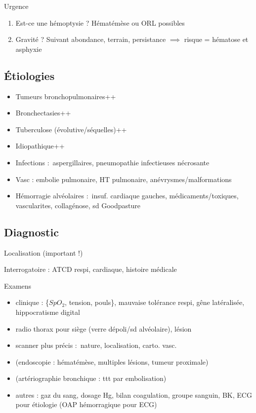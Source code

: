 \documentclass{article}
\begin{document}
Urgence \skull

\begin{enumerate}
  \item Est-ce une hémoptysie ? Hématémèse ou ORL possibles
  \item Gravité ? Suivant abondance, terrain, persistance $\implies$ risque = hématose et asphyxie
\end{enumerate}

\subsection{Étiologies}
\begin{itemize}
  \item Tumeurs bronchopulmonaires++
  \item Bronchectasies++
  \item Tuberculose (évolutive/séquelles)++
  \item Idiopathique++
  \item Infections : aspergillaires, pneumopathie infectieuses nécrosante
  \item Vasc : embolie pulmonaire, HT pulmonaire, anévrysmes/malformations
  \item Hémorragie alvéolaires : insuf. cardiaque gauches, médicaments/toxiques,
    vascularites, collagénose, sd Goodpasture
\end{itemize}

\subsection{Diagnostic}
Localisation (important !)

Interrogatoire : ATCD respi, cardiaque, histoire médicale

Examens 
\begin{itemize}
  \item clinique : \{$SpO_2$, tension, pouls\}, mauvaise tolérance respi, gêne
    latéralisée, hippocratisme digital
  \item radio thorax pour siège (verre dépoli/sd alvéolaire), lésion
  \item scanner plus précis : nature, localisation, carto. vasc.
  \item (endoscopie : hématémèse, multiples lésions, tumeur proximale)
  \item (artériographie bronchique : ttt par embolisation)
  \item autres : gaz du sang, dosage Hg, bilan coagulation, groupe sanguin, {BK,
    ECG} pour étiologie (OAP hémorragique pour ECG)
\end{itemize}
\end{document}

